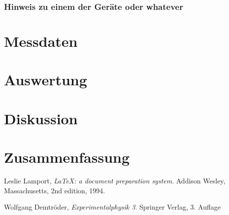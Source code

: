 \documentclass[10pt, a4paper]{article}
\begin{document}
\subsubsection{Hinweis zu einem der Geräte oder whatever}

\section{Messdaten}

\section{Auswertung}

\section{Diskussion}

\section{Zusammenfassung}


\begin{thebibliography}{9}

  Leslie Lamport,
  \emph{\LaTeX: a document preparation system}.
  Addison Wesley, Massachusetts,
  2nd edition,
  1994.
  
	Wolfgang Demtröder,
	\emph{Experimentalphysik 3}.
	Springer Verlag,
	3. Auflage
\end{thebibliography}


\newpage

\begin{appendix}

\end{appendix}
\end{document}
